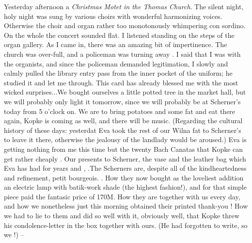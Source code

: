 Yesterday afternoon a \textit{Christmas Motet in the Thomas Church}. The silent night, holy night was sung by various choirs with wonderful harmonizing voices. Otherwise the choir and organ rather too monotonously whimpering con sordino. On the whole the concert sounded flat. I listened standing on the steps of the organ gallery. As I came in, there was an amazing bit of impertinence. The church was over-full, and a policeman was turning away . I said that I was with the organists, and since the policeman demanded legitimation, I slowly and calmly pulled the library entry pass from the inner pocket of the uniform; he studied it and let me through. This card has already blessed me with the most wicked surprises...We bought ourselves a little potted tree in the market hall, but we will probably only light it tomorrow, since we will probably be at Scherner's today from 5 o'clock on. We are to bring potatoes and some fat and eat there again, Kopke is coming as well, and there will be music. (Regarding the cultural history of these days: yesterdat Eva took the rest of our Wilna fat to Scherner's to leave it there, otherwise the jealousy of the landlady would be aroused.) Eva is getting nothing from me this time but the twenty Bach Canatas that Kopke can get rather cheaply . Our presents to Scherner, the vase and the leather bag which Eva has had for years and , .The Scherners are, despite all of the kindheartedness and refinement, petit bourgeois. . How they now bought as the loveliest addition an electric lamp with batik-work shade (the highest fashion!), and for that simple piece paid the fantasic price of 170M. How they are together with us every day, and how we nonetheless just this morning obtained their printed thank-you ! How we had to lie to them and did so well with it, obviously well, that Kopke threw his condolence-letter in the box together with ours. (He had forgotten to write, so we !) --

